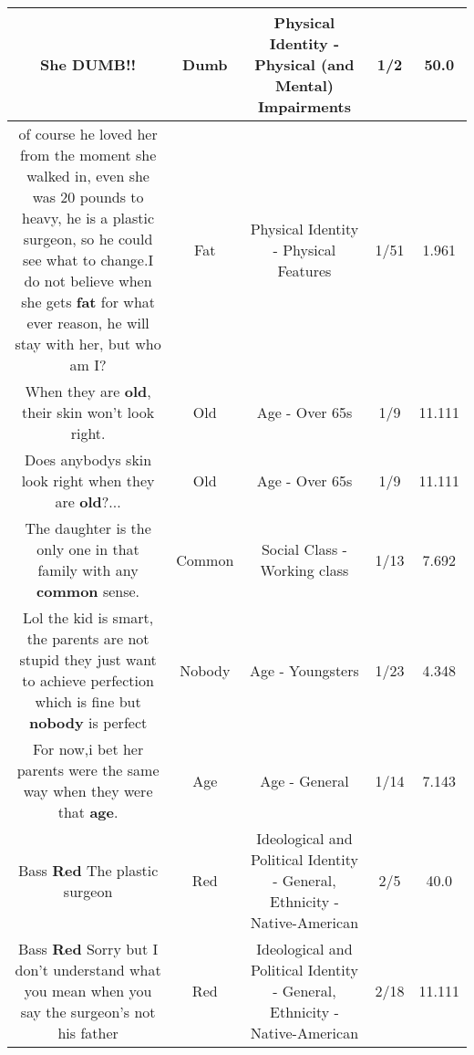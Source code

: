 \documentclass[11pt]{article}
\newlength\mylength
\begin{document}
\begin{center}
\begin{longtable}{|C{.65\mylength}|C{.30\mylength}|C{.12\mylength}|C{.12\mylength}|C{.12\mylength}|}
  \small She \textbf{DUMB}!!\normalsize   & Dumb & Physical Identity - Physical (and Mental) Impairments & 1/2 & 50.0 \\  \hline
  \small of course he loved her from the moment she walked in, even she was 20 pounds to heavy, he is a plastic surgeon, so he could see what to change.I do not believe when she gets \textbf{fat} for what ever reason, he will stay with her, but who am I?\normalsize   & Fat & Physical Identity - Physical Features & 1/51 & 1.961 \\  \hline
  \small When they are \textbf{old}, their skin won't look right.\normalsize   & Old & Age - Over 65s & 1/9 & 11.111 \\  \hline
  \small Does anybodys skin look right when they are \textbf{old}?...\normalsize   & Old & Age - Over 65s & 1/9 & 11.111 \\  \hline
  \small The daughter is the only one in that family with any \textbf{common} sense.\normalsize   & Common & Social Class - Working class & 1/13 & 7.692 \\  \hline
  \small Lol the kid is smart, the parents are not stupid they just want to achieve perfection which is fine but \textbf{nobody} is perfect\normalsize   & Nobody & Age - Youngsters & 1/23 & 4.348 \\  \hline
  \small For now,i bet her parents were the same way when they were that \textbf{age}.\normalsize   & Age & Age - General & 1/14 & 7.143 \\  \hline
  \small Bass \textbf{R\textbf{ed}} The plastic surgeon\normalsize   & Red &  Ideological and Political Identity - General, Ethnicity - Native-American & 2/5 & 40.0 \\  \hline
  \small Bass \textbf{R\textbf{ed}} Sorry but I don't understand what you mean when you say the surgeon's not his father\normalsize   & Red &  Ideological and Political Identity - General, Ethnicity - Native-American & 2/18 & 11.111 \\  \hline

\end{longtable}
\end{center}
\end{document}

